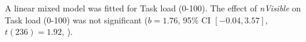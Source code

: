 A linear mixed model was fitted for Task load (0-100).
The effect of \textit{nVisible} on Task load (0-100) was not significant ($b = 1.76$, 95\% CI $[-0.04, 3.57]$, $t(236) = 1.92$, ).
